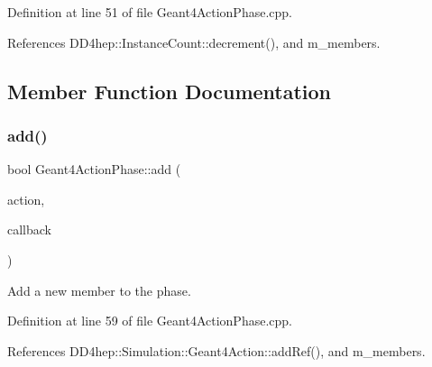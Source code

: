 Definition at line 51 of file Geant4\+Action\+Phase.\+cpp.



References D\+D4hep\+::\+Instance\+Count\+::decrement(), and m\+\_\+members.



\subsection{Member Function Documentation}
\hypertarget{class_d_d4hep_1_1_simulation_1_1_geant4_action_phase_a61f8e3266a3e0f059539479fd335bb08}{}\label{class_d_d4hep_1_1_simulation_1_1_geant4_action_phase_a61f8e3266a3e0f059539479fd335bb08} 
\subsubsection{\texorpdfstring{add()}{add()}\hspace{0.1cm}{\footnotesize\ttfamily [1/4]}}
{\footnotesize\ttfamily bool Geant4\+Action\+Phase\+::add (\begin{DoxyParamCaption}\item[{\hyperlink{class_d_d4hep_1_1_simulation_1_1_geant4_action}{Geant4\+Action} $\ast$}]{action,  }\item[{\hyperlink{class_d_d4hep_1_1_callback}{Callback}}]{callback }\end{DoxyParamCaption})\hspace{0.3cm}{\ttfamily [virtual]}}



Add a new member to the phase. 



Definition at line 59 of file Geant4\+Action\+Phase.\+cpp.



References D\+D4hep\+::\+Simulation\+::\+Geant4\+Action\+::add\+Ref(), and m\+\_\+members.

\hypertarget{class_d_d4hep_1_1_simulation_1_1_geant4_action_phase_ac5f83b6eac8a29459e85cfcad61db876}{}\label{class_d_d4hep_1_1_simulation_1_1_geant4_action_phase_ac5f83b6eac8a29459e85cfcad61db876} 
